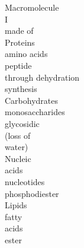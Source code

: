 \documentclass{article}
\begin{document}
Macromolecule\\
I\\
made of\\
Proteins\\
amino acids\\
peptide\\
through dehydration\\
synthesis\\
Carbohydrates\\
monosaccharides\\
glycosidic\\
(loss of\\
water)\\
Nucleic\\
acids\\
nucleotides\\
phosphodiester\\
Lipids\\
fatty\\
acids\\
ester\\
\newpage 
\end{document}
